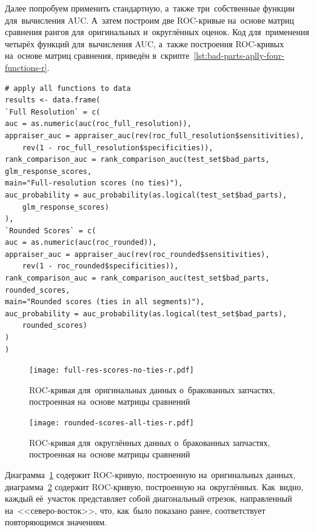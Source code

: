 \documentclass[]{scrreprt}
\begin{document}
Далее попробуем применить стандартную, а~также три~собственные функции для~вычисления AUC. А~затем построим две ROC-кривые на~основе матриц сравнения рангов для~оригинальных и~округлённых оценок. Код для~применения четырёх функций для~вычисления AUC, а~также построения ROC-кривых на~основе матриц сравнения, приведён в~скрипте~\ref{lst:bad-parts-aplly-four-functions-r}.
%
\begin{lstlisting}[float, caption = Применение четырёх функций для~вычимсления AUC и~построение ROC-кривых на~основе матриц сравнения для~оригинальных и~округлённых оценок, firstnumber=1, label= lst:bad-parts-aplly-four-functions-r]
# apply all functions to data
results <- data.frame(
`Full Resolution` = c(
auc = as.numeric(auc(roc_full_resolution)),
appraiser_auc = appraiser_auc(rev(roc_full_resolution$sensitivities),
	rev(1 - roc_full_resolution$specificities)),
rank_comparison_auc = rank_comparison_auc(test_set$bad_parts,
glm_response_scores, 
main="Full-resolution scores (no ties)"),
auc_probability = auc_probability(as.logical(test_set$bad_parts),
	glm_response_scores)
),
`Rounded Scores` = c( 
auc = as.numeric(auc(roc_rounded)),
appraiser_auc = appraiser_auc(rev(roc_rounded$sensitivities),
	rev(1 - roc_rounded$specificities)),
rank_comparison_auc = rank_comparison_auc(test_set$bad_parts, rounded_scores,
main="Rounded scores (ties in all segments)"),
auc_probability = auc_probability(as.logical(test_set$bad_parts),
	rounded_scores)
)
)
\end{lstlisting}
%
\begin{figure}[ht]
	\centering
	\texttt{[image: full-res-scores-no-ties-r.pdf]}
	\caption{ROC-кривая для~оригинальных данных о~бракованных запчастях, построенная на~основе матрицы сравнений}
	\label{fig:bad-parts-ROC-original-r}
\end{figure}
%
\begin{figure}[ht]
	\centering
	\texttt{[image: rounded-scores-all-ties-r.pdf]}
	\caption{ROC-кривая для~округлённых данных о~бракованных запчастях, построенная на~основе матрицы сравнений}
	\label{fig:bad-parts-ROC-rounded-r}
\end{figure}
%

Диаграмма~\ref{fig:bad-parts-ROC-original-r} содержит ROC-кривую, построенную на~оригинальных данных, диаграмма~\ref{fig:bad-parts-ROC-rounded-r} содержит ROC-кривую, построенную на~округлённых. Как~видно, каждый её~участок представляет собой диагональный отрезок, направленный на~<<северо-восток>>, что, как~было показано ранее, соответствует повторяющимся значениям.
\end{document}

